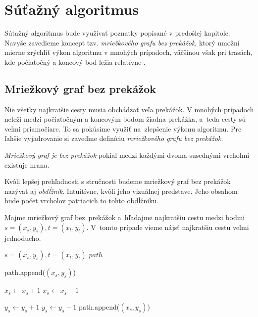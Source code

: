 \chapter{Súťažný algoritmus}
Súťažný algoritmus bude využívať poznatky popísané v predošlej kapitole. Navyše zavedieme koncept tzv. {\sl mriežkového grafu bez prekážok}, ktorý umožní mierne zrýchliť výkon algoritmu v mnohých prípadoch, väčšinou však pri trasách, kde počiatočný a koncový bod ležia relatívne .


\section{Mriežkový graf bez prekážok}
Nie všetky najkratšie cesty musia obchádzať veľa prekážok. 
V mnohých prípadoch neleží medzi počiatočným a koncovým bodom žiadna prekážka, a~teda cesty sú veľmi priamočiare. To sa pokúsime využiť na~zlepšenie výkonu algoritmu.
Pre ľahšie vyjadrovanie si zaveďme definíciu {\sl mriežkového grafu bez prekážok}.

\begin{define}
{\sl Mriežkový graf je bez prekážok} 
pokiaľ medzi každými dvoma susednými vrcholmi existuje hrana.
\end{define}
Kvôli lepšej prehľadnosti s stručnosti budeme mriežkový graf bez prekážok nazývať aj {\sl obdĺžnik}.
Intuitívne, kvôli jeho vizuálnej predstave. Jeho obsahom bude počet vrcholov patriacich to tohto obdĺžniku.

Majme mriežkový graf bez~prekážok a~hľadajme najkratšiu cestu medzi bodmi $s=(x_s,y_s), t=(x_t,y_t)$.
V~tomto prípade vieme nájsť najkratšiu cestu veľmi jednoducho.

\begin{algorithm}
\caption{Nájdi najkratšiu cestu medzi dvoma bodmi $s$ a $t$ na mriežkovom grafe bez prekážok}
\label{alg1}
\begin{algorithmic}[1] %
\REQUIRE $s=(x_s,y_s), t=(x_t,y_t)$
\ENSURE $path$


\STATE path.append($(x_s, y_s)$)

		\STATE $x_s \leftarrow x_s + 1$
		\STATE $x_s \leftarrow x_s - 1$
	\ENDIF

		\STATE $y_s \leftarrow y_s + 1$
		\STATE $y_s \leftarrow y_s - 1$
	\ENDIF
	\STATE path.append($(x_s, y_s)$)
\ENDWHILE

\end{algorithmic}
\end{algorithm}



